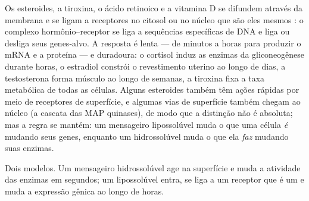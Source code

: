 \begin{proposition}\label{prop:b2:cell-signalling:nuclear}
Os esteroides, a tiroxina, o ácido retinoico e a vitamina D se difundem
através da membrana e se ligam a receptores no citosol ou no núcleo que
são eles mesmos \emph{}: o complexo
hormônio--receptor se liga a sequências específicas de DNA e liga ou
desliga seus genes-alvo. A resposta é lenta --- de minutos a horas para
produzir o mRNA e a proteína --- e duradoura: o cortisol induz as enzimas
da gliconeogênese durante horas, o estradiol constrói o revestimento
uterino ao longo de dias, a testosterona forma músculo ao longo de
semanas, a tiroxina fixa a taxa metabólica de todas as células. Alguns
esteroides também têm ações rápidas por meio de receptores de
superfície, e algumas vias de superfície também chegam ao núcleo (a
cascata das MAP quinases), de modo que a distinção não é absoluta; mas
a regra se mantém: um mensageiro lipossolúvel muda o que uma célula
\emph{é} mudando seus genes, enquanto um hidrossolúvel muda o que ela
\emph{faz} mudando suas enzimas.
\end{proposition}

\begin{omfigure}

{\small Dois modelos. Um mensageiro hidrossolúvel age na superfície e
muda a atividade das enzimas em segundos; um lipossolúvel entra, se liga
a um receptor que é um  e muda a expressão gênica
ao longo de horas.}
\end{omfigure}

